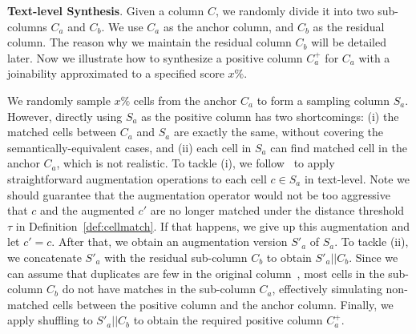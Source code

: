 




\vspace{1mm}
\noindent \textbf{Text-level Synthesis}.
Given a column $C$, we randomly divide it into two sub-columns $C_a$ and $C_b$. We use $C_a$ as the anchor column, and $C_b$ as the residual column. 
The reason why we maintain the residual column $C_b$ will be detailed later.
Now we illustrate how to synthesize a positive column $C_a^+$ for $C_a$ with a joinability approximated to a specified score $x\%$.


We randomly sample $x\%$ cells from the anchor $C_a$ to form a sampling column $S_a$. However, directly using $S_a$ as the positive column has two shortcomings: (i) the matched cells between $C_a$ and $S_a$ are exactly the same, without covering the semantically-equivalent cases, and (ii) each cell in $S_a$ can find matched cell in the anchor $C_a$, which is not realistic.
To tackle (i), we follow~\cite{Watchog,starmine} to apply straightforward augmentation operations to each cell $c \in S_a$ in text-level.  Note we should guarantee that the augmentation operator would not be too aggressive that $c$ and the augmented $c'$ are no longer matched under the distance threshold $\tau$ in Definition~\ref{def:cellmatch}. If that happens, we give up this augmentation and let $c'= c$. After that, we obtain an augmentation version $S'_a$ of $S_a$.
To tackle (ii), we concatenate $S'_a$ with the residual sub-column $C_b$ to obtain $S'_a || C_b$. Since we can assume that duplicates are few in the original column~\cite{autofuzzyjoin},  most cells in the sub-column $C_b$ do not have matches in the sub-column $C_a$, effectively simulating non-matched cells between the positive column and the anchor column.
Finally, we apply shuffling to $S'_a || C_b$ to obtain the required positive column $C_a^+$.



